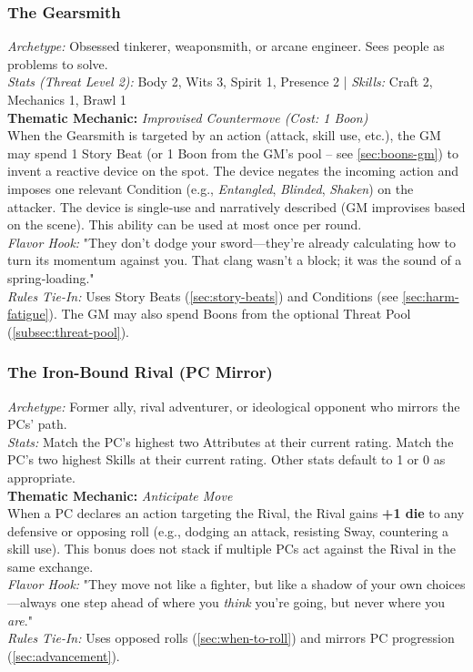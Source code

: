 \subsubsection{The Gearsmith}
\textit{Archetype:} Obsessed tinkerer, weaponsmith, or arcane engineer. Sees people as problems to solve.\\
\textit{Stats (Threat Level 2):} Body 2, Wits 3, Spirit 1, Presence 2 \quad | \quad \textit{Skills:} Craft 2, Mechanics 1, Brawl 1\\
\textbf{Thematic Mechanic:} \textit{Improvised Countermove (Cost: 1 Boon)} \\
When the Gearsmith is targeted by an action (attack, skill use, etc.), the GM may spend 1 Story Beat (or 1 Boon from the GM's pool -- see \autoref{sec:boons-gm}) to invent a reactive device on the spot. The device negates the incoming action and imposes one relevant Condition (e.g., \textit{Entangled}, \textit{Blinded}, \textit{Shaken}) on the attacker. The device is single‑use and narratively described (GM improvises based on the scene). This ability can be used at most once per round.\\
\textit{Flavor Hook:} "They don't dodge your sword---they're already calculating how to turn its momentum against you. That clang wasn't a block; it was the sound of a spring‑loading."\\
\textit{Rules Tie-In:} Uses Story Beats (\autoref{sec:story-beats}) and Conditions (see \autoref{sec:harm-fatigue}). The GM may also spend Boons from the optional Threat Pool (\autoref{subsec:threat-pool}).

\subsubsection{The Iron-Bound Rival (PC Mirror)}
\textit{Archetype:} Former ally, rival adventurer, or ideological opponent who mirrors the PCs' path.\\
\textit{Stats:} Match the PC's highest two Attributes at their current rating. Match the PC's two highest Skills at their current rating. Other stats default to 1 or 0 as appropriate.\\
\textbf{Thematic Mechanic:} \textit{Anticipate Move} \\
When a PC declares an action targeting the Rival, the Rival gains \textbf{+1 die} to any defensive or opposing roll (e.g., dodging an attack, resisting Sway, countering a skill use). This bonus does not stack if multiple PCs act against the Rival in the same exchange.\\
\textit{Flavor Hook:} "They move not like a fighter, but like a shadow of your own choices---always one step ahead of where you \textit{think} you're going, but never where you \textit{are}."\\
\textit{Rules Tie-In:} Uses opposed rolls (\autoref{sec:when-to-roll}) and mirrors PC progression (\autoref{sec:advancement}).

